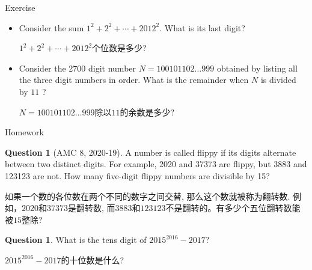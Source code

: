 \documentclass{beamer}
\theoremstyle{definition}
\newtheorem{ques}[defn]{Question}
\begin{document}
\begin{frame}{Exercise}
    \begin{itemize}
        \item Consider the sum $1^2+2^2+\cdots+2012^2$. What is its last digit?

              $1^2+2^2+\cdots+2012^2$个位数是多少?

        \item Consider the 2700 digit number $N=100101102 \ldots 999$ obtained by listing all the three digit numbers in order. What is the remainder when $N$ is divided by $11$ ?

              $N=100101102 \ldots 999$除以$11$的余数是多少?
    \end{itemize}
\end{frame}
\begin{frame}{Homework}
    \begin{ques}[AMC 8, 2020-19]
        A number is called flippy if its digits alternate between two distinct digits. For example, 2020 and 37373 are flippy, but 3883 and 123123 are not. How many five-digit flippy numbers are divisible by 15?

        如果一个数的各位数在两个不同的数字之间交替, 那么这个数就被称为翻转数. 例如，$2020$和$37373$是翻转数, 而$3883$和$123123$不是翻转的。有多少个五位翻转数能被$15$整除?
    \end{ques}
    \begin{ques}
        What is the tens digit of $2015^{2016}-2017$?

        $2015^{2016}-2017$的十位数是什么?
    \end{ques}
\end{frame}
\end{document}
